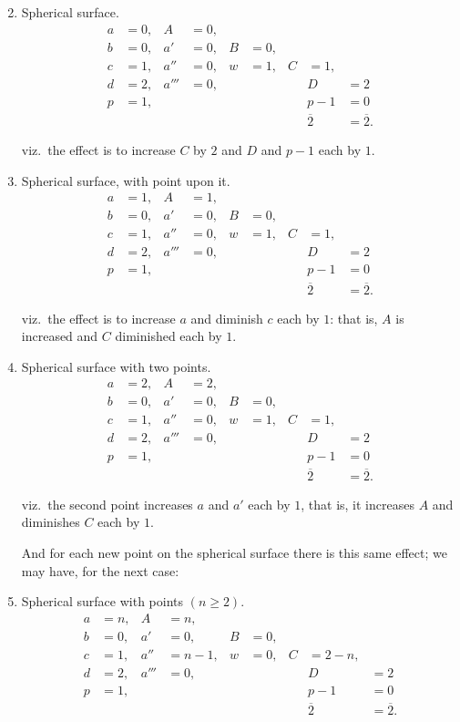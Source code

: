 \documentclass[11pt,a4paper]{article}
\theoremstyle{plain}
\theoremstyle{definition}
\begin{document}
\begin{enumerate}
\setcounter{enumi}{1}
\item Spherical surface.
\begin{align*}
a &= 0, & A &= 0, \\
b &= 0, & a' &= 0, & B &= 0, \\
c &= 1, & a'' &= 0, & w &= 1, & C &= 1, \\
d &= 2, & a''' &= 0, & & & & D &= 2 \\
p &= 1, & & & & & & p - 1 &= 0 \\[2pt]
& & & & & & & \overline{2} &= \overline{2}.
\end{align*}

viz.\ the effect is to increase $C$ by $2$ and $D$ and $p-1$ each by $1$.

\item Spherical surface, with point upon it.
\begin{align*}
a &= 1, & A &= 1, \\
b &= 0, & a' &= 0, & B &= 0, \\
c &= 1, & a'' &= 0, & w &= 1, & C &= 1, \\
d &= 2, & a''' &= 0, & & & & D &= 2 \\
p &= 1, & & & & & & p - 1 &= 0 \\[2pt]
& & & & & & & \overline{2} &= \overline{2}.
\end{align*}

viz.\ the effect is to increase $a$ and diminish $c$ each by $1$: that is, $A$ is increased
and $C$ diminished each by $1$.

\item Spherical surface with two points.
\begin{align*}
a &= 2, & A &= 2, \\
b &= 0, & a' &= 0, & B &= 0, \\
c &= 1, & a'' &= 0, & w &= 1, & C &= 1, \\
d &= 2, & a''' &= 0, & & & & D &= 2 \\
p &= 1, & & & & & & p - 1 &= 0 \\[2pt]
& & & & & & & \overline{2} &= \overline{2}.
\end{align*}

viz.\ the second point increases $a$ and $a'$ each by $1$, that is, it increases $A$ and
diminishes $C$ each by $1$.

And for each new point on the spherical surface there is this same effect; we
may have, for the next case:

\item Spherical surface with points $(n \geq 2)$.
\begin{align*}
a &= n, & A &= n, \\
b &= 0, & a' &= 0, & B &= 0, \\
c &= 1, & a'' &= n - 1, & w &= 0, & C &= 2 - n, \\
d &= 2, & a''' &= 0, & & & & D &= 2 \\
p &= 1, & & & & & & p - 1 &= 0 \\[2pt]
& & & & & & & \overline{2} &= \overline{2}.
\end{align*}
\end{enumerate}
\end{document}
